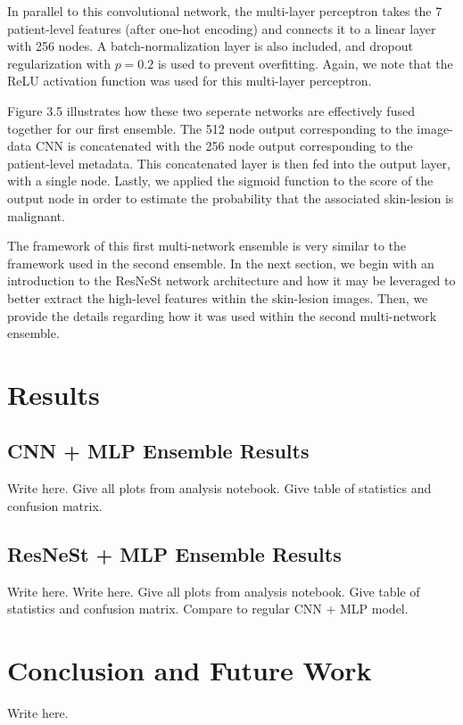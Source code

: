\documentclass [MAS] {uclathes}
\begin{document}
In parallel to this convolutional network, the multi-layer perceptron takes the 7 patient-level features (after one-hot encoding) and connects it to a linear layer with 256 nodes. A batch-normalization layer is also included, and dropout regularization with $p=0.2$ is used to prevent overfitting. Again, we note that the ReLU activation function was used for this multi-layer perceptron. 


Figure 3.5 illustrates how these two seperate networks are effectively fused together for our first ensemble. The 512 node output corresponding to the image-data CNN is concatenated with the 256 node output corresponding to the patient-level metadata. This concatenated layer is then fed into the output layer, with a single node. Lastly, we applied the sigmoid function to the score of the output node in order to estimate the probability that the associated skin-lesion is malignant.

The framework of this first multi-network ensemble is very similar to the framework used in the second ensemble. In the next section, we begin with an introduction to the ResNeSt network architecture and how it may be leveraged to better extract the high-level features within the skin-lesion images. Then, we provide the details regarding how it was used within the second multi-network ensemble.




\chapter{Results}


\section{CNN + MLP Ensemble Results}

Write here. Give all plots from analysis notebook. Give table of statistics and confusion matrix.

\section{ResNeSt + MLP Ensemble Results}

Write here. Write here. Give all plots from analysis notebook. Give table of statistics and confusion matrix. Compare to regular CNN + MLP model.


\chapter{Conclusion and Future Work}

Write here.



\end{document}
